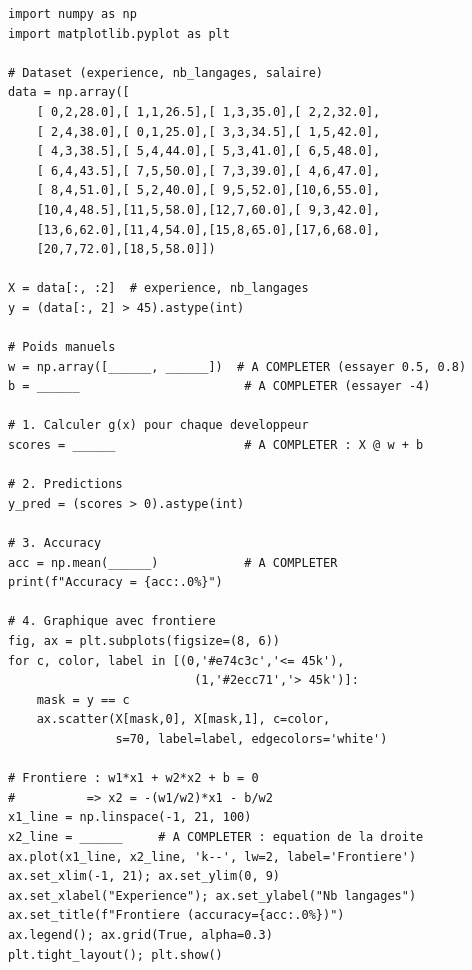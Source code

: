 \begin{pythonbox}
\begin{lstlisting}
import numpy as np
import matplotlib.pyplot as plt

# Dataset (experience, nb_langages, salaire)
data = np.array([
    [ 0,2,28.0],[ 1,1,26.5],[ 1,3,35.0],[ 2,2,32.0],
    [ 2,4,38.0],[ 0,1,25.0],[ 3,3,34.5],[ 1,5,42.0],
    [ 4,3,38.5],[ 5,4,44.0],[ 5,3,41.0],[ 6,5,48.0],
    [ 6,4,43.5],[ 7,5,50.0],[ 7,3,39.0],[ 4,6,47.0],
    [ 8,4,51.0],[ 5,2,40.0],[ 9,5,52.0],[10,6,55.0],
    [10,4,48.5],[11,5,58.0],[12,7,60.0],[ 9,3,42.0],
    [13,6,62.0],[11,4,54.0],[15,8,65.0],[17,6,68.0],
    [20,7,72.0],[18,5,58.0]])

X = data[:, :2]  # experience, nb_langages
y = (data[:, 2] > 45).astype(int)

# Poids manuels
w = np.array([______, ______])  # A COMPLETER (essayer 0.5, 0.8)
b = ______                       # A COMPLETER (essayer -4)

# 1. Calculer g(x) pour chaque developpeur
scores = ______                  # A COMPLETER : X @ w + b

# 2. Predictions
y_pred = (scores > 0).astype(int)

# 3. Accuracy
acc = np.mean(______)            # A COMPLETER
print(f"Accuracy = {acc:.0%}")

# 4. Graphique avec frontiere
fig, ax = plt.subplots(figsize=(8, 6))
for c, color, label in [(0,'#e74c3c','<= 45k'),
                          (1,'#2ecc71','> 45k')]:
    mask = y == c
    ax.scatter(X[mask,0], X[mask,1], c=color,
               s=70, label=label, edgecolors='white')

# Frontiere : w1*x1 + w2*x2 + b = 0
#          => x2 = -(w1/w2)*x1 - b/w2
x1_line = np.linspace(-1, 21, 100)
x2_line = ______     # A COMPLETER : equation de la droite
ax.plot(x1_line, x2_line, 'k--', lw=2, label='Frontiere')
ax.set_xlim(-1, 21); ax.set_ylim(0, 9)
ax.set_xlabel("Experience"); ax.set_ylabel("Nb langages")
ax.set_title(f"Frontiere (accuracy={acc:.0%})")
ax.legend(); ax.grid(True, alpha=0.3)
plt.tight_layout(); plt.show()
\end{lstlisting}
\end{pythonbox}


